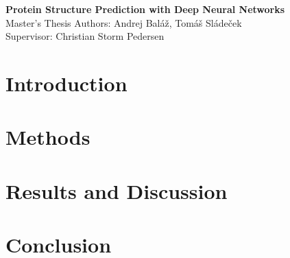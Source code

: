 \documentclass[12pt]{article}
\begin{document}
\begin{titlepage}
    \begin{center}
        \vspace*{8cm}
        \Huge
            \textbf{Protein Structure Prediction with Deep Neural Networks}
        \vspace{0.5cm}\\
        \LARGE
            Master's Thesis
        \vfill
        \vspace{0.8cm}
        \Large
            Authors: Andrej Baláž, Tomáš Sládeček\\
            Supervisor: Christian Storm Pedersen
    \end{center}
\end{titlepage}
\pagebreak

\section{Introduction}


\section{Methods}


\section{Results and Discussion}


\section{Conclusion}

\end{document}
